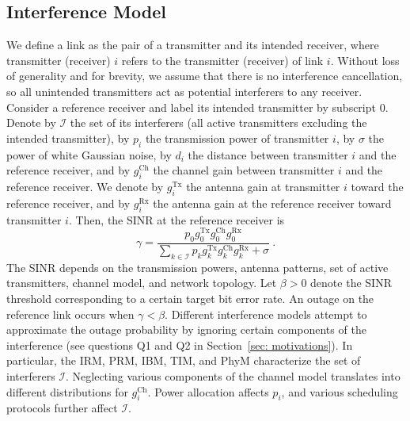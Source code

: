 \documentclass[12pt, draftclsnofoot, onecolumn]{IEEEtran}
\begin{document}
\subsection{Interference Model}
We define a link as the pair of a transmitter and its intended receiver, where transmitter (receiver) $i$ refers to the transmitter (receiver) of link $i$. Without loss of generality and for brevity, we assume that there is no interference cancellation, so all unintended transmitters act as potential interferers to any receiver. Consider a reference receiver and label its intended transmitter by subscript 0. Denote by $\mathcal{I}$ the set of its interferers (all active transmitters excluding the intended transmitter), by $p_i$ the transmission power of transmitter $i$, by $\sigma$ the power of white Gaussian noise, by $d_{i}$ the distance between transmitter $i$ and the reference receiver, and by $g_{i}^{\mathrm{Ch}}$ the channel gain between transmitter $i$ and the reference receiver.
We denote by $g_{i}^{\mathrm{Tx}}$ the antenna gain at transmitter $i$ toward the reference receiver, and by $g_{i}^{\mathrm{Rx}}$ the antenna gain at the reference receiver toward transmitter $i$. Then, the SINR at the reference receiver is
\begin{equation*}
\gamma = \frac{p_0 g_{0}^{\mathrm{Tx}} g_{0}^{\mathrm{Ch}} g_{0}^{\mathrm{Rx}}}{\sum\limits_{k \in \mathcal{I}} p_k g_{k}^{\mathrm{Tx}} g_{k}^{\mathrm{Ch}} g_{k}^{\mathrm{Rx}} + \sigma} \:.
\end{equation*}
The SINR depends on the transmission powers, antenna patterns, set of active transmitters, channel model, and network topology. Let $\beta>0$ denote the SINR threshold corresponding to a certain target bit error rate. An outage on the reference link occurs when $\gamma < \beta$. Different interference models attempt to approximate the outage probability by ignoring certain components of the interference (see questions Q1 and Q2 in Section~\ref{sec: motivations}). In particular, the IRM, PRM, IBM, TIM, and PhyM characterize the set of interferers $\mathcal{I}$. Neglecting various components of the channel model translates into different distributions for $g_{i}^{\mathrm{Ch}}$.
Power allocation affects $p_i$, and various scheduling protocols further affect $\mathcal{I}$.
\end{document}
